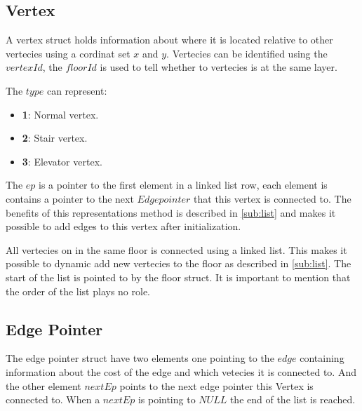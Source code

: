 \begin{minipage}{\linewidth}
\subsection{Vertex}
A vertex struct holds information about where it is located relative to other vertecies using a cordinat set $x$ and $y$. Vertecies can be identified using the $vertexId$, the $floorId$ is used to tell whether to vertecies is at the same layer.

 The $type$ can represent:
\begin{itemize}[noitemsep]
	\item \textbf{1}: Normal vertex.
	\item \textbf{2}: Stair vertex.
	\item \textbf{3}: Elevator vertex.
\end{itemize}

The $ep$ is a pointer to the first element in a linked list row, each element is contains a pointer to the next $Edge pointer$ that this vertex is connected to. The benefits of this representations method is described in \cref{sub:list} and makes it possible to add edges to this vertex after initialization.


All vertecies on in the same floor is connected using a linked list. This makes it possible to dynamic add new vertecies to the floor as described in \cref{sub:list}. The start of the list is pointed to by the floor struct. It is important to mention that the order of the list plays no role.   


 \label{vertex_struct}
\end{minipage}

\begin{minipage}{\linewidth}
\subsection{Edge Pointer}
The edge pointer struct have two elements one pointing to the $edge$ containing information about the cost of the edge and which vetecies it is connected to. And the other element $nextEp$ points to the next edge pointer this Vertex is connected to. When a $nextEp$ is pointing to $NULL$ the end of the list is reached.
 \label{ep_struct}
\end{minipage}



